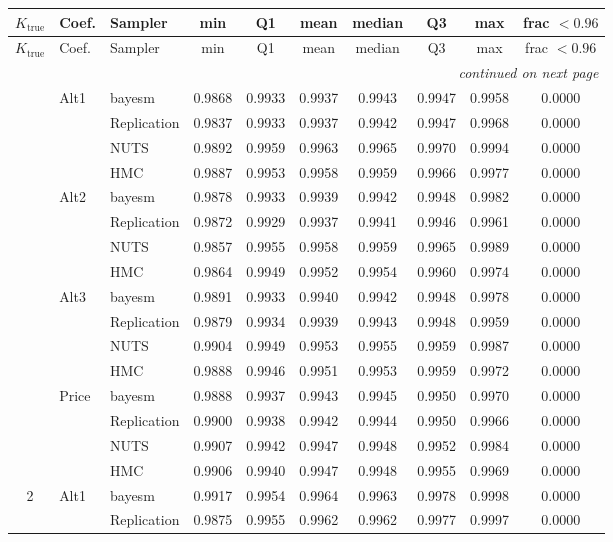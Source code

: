 \begin{longtable}{cllccccccc}
\toprule
$K_{\text{true}}$ & Coef. & Sampler & min & Q1 & mean & median & Q3 & max & frac $<0.96$ \\
\midrule
\endfirsthead
\toprule
$K_{\text{true}}$ & Coef. & Sampler & min & Q1 & mean & median & Q3 & max & frac $<0.96$ \\
\midrule
\endhead
\midrule
\multicolumn{10}{r}{\emph{continued on next page}} \\
\endfoot
\bottomrule
\endlastfoot
1 & Alt1 & bayesm & 0.9868 & 0.9933 & 0.9937 & 0.9943 & 0.9947 & 0.9958 & 0.0000 \\
 &  & Replication & 0.9837 & 0.9933 & 0.9937 & 0.9942 & 0.9947 & 0.9968 & 0.0000 \\
 &  & NUTS & 0.9892 & 0.9959 & 0.9963 & 0.9965 & 0.9970 & 0.9994 & 0.0000 \\
 &  & HMC & 0.9887 & 0.9953 & 0.9958 & 0.9959 & 0.9966 & 0.9977 & 0.0000 \\
 & Alt2 & bayesm & 0.9878 & 0.9933 & 0.9939 & 0.9942 & 0.9948 & 0.9982 & 0.0000 \\
 &  & Replication & 0.9872 & 0.9929 & 0.9937 & 0.9941 & 0.9946 & 0.9961 & 0.0000 \\
 &  & NUTS & 0.9857 & 0.9955 & 0.9958 & 0.9959 & 0.9965 & 0.9989 & 0.0000 \\
 &  & HMC & 0.9864 & 0.9949 & 0.9952 & 0.9954 & 0.9960 & 0.9974 & 0.0000 \\
 & Alt3 & bayesm & 0.9891 & 0.9933 & 0.9940 & 0.9942 & 0.9948 & 0.9978 & 0.0000 \\
 &  & Replication & 0.9879 & 0.9934 & 0.9939 & 0.9943 & 0.9948 & 0.9959 & 0.0000 \\
 &  & NUTS & 0.9904 & 0.9949 & 0.9953 & 0.9955 & 0.9959 & 0.9987 & 0.0000 \\
 &  & HMC & 0.9888 & 0.9946 & 0.9951 & 0.9953 & 0.9959 & 0.9972 & 0.0000 \\
 & Price & bayesm & 0.9888 & 0.9937 & 0.9943 & 0.9945 & 0.9950 & 0.9970 & 0.0000 \\
 &  & Replication & 0.9900 & 0.9938 & 0.9942 & 0.9944 & 0.9950 & 0.9966 & 0.0000 \\
 &  & NUTS & 0.9907 & 0.9942 & 0.9947 & 0.9948 & 0.9952 & 0.9984 & 0.0000 \\
 &  & HMC & 0.9906 & 0.9940 & 0.9947 & 0.9948 & 0.9955 & 0.9969 & 0.0000 \\
2 & Alt1 & bayesm & 0.9917 & 0.9954 & 0.9964 & 0.9963 & 0.9978 & 0.9998 & 0.0000 \\
 &  & Replication & 0.9875 & 0.9955 & 0.9962 & 0.9962 & 0.9977 & 0.9997 & 0.0000 \\

\end{longtable}
